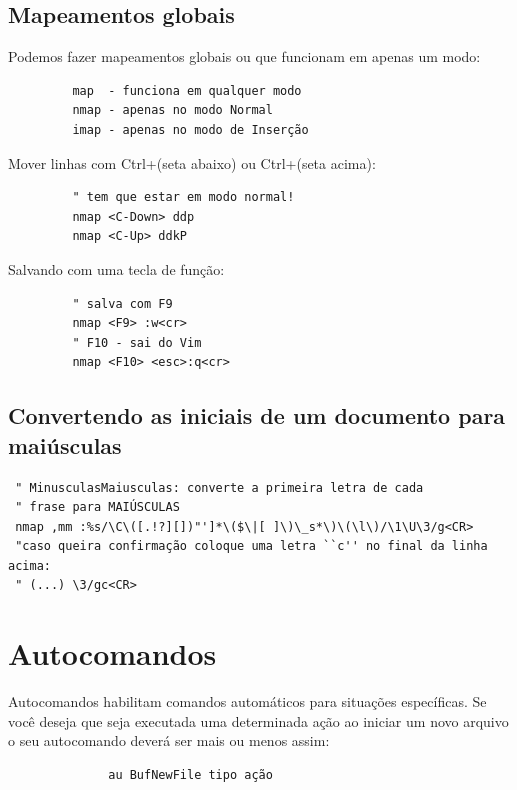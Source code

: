 \documentclass[10pt,a4paper,openany]{book}
\begin{document}
\subsection{Mapeamentos globais}


Podemos fazer mapeamentos globais ou que funcionam em apenas um modo:

\begin{verbatim}
		 map  - funciona em qualquer modo
		 nmap - apenas no modo Normal
		 imap - apenas no modo de Inserção
\end{verbatim}

Mover linhas com Ctrl+(seta abaixo) ou Ctrl+(seta acima):

\begin{verbatim}
		 " tem que estar em modo normal!
		 nmap <C-Down> ddp
		 nmap <C-Up> ddkP
\end{verbatim}

Salvando com uma tecla de função:

\begin{verbatim}
		 " salva com F9
		 nmap <F9> :w<cr>
		 " F10 - sai do Vim
		 nmap <F10> <esc>:q<cr>
\end{verbatim}

\subsection{Convertendo as iniciais de um documento para maiúsculas}
\label{Convertendo as iniciais de um documento para maiúsculas}

\begin{verbatim}
 " MinusculasMaiusculas: converte a primeira letra de cada
 " frase para MAIÚSCULAS
 nmap ,mm :%s/\C\([.!?][])"']*\($\|[ ]\)\_s*\)\(\l\)/\1\U\3/g<CR>
 "caso queira confirmação coloque uma letra ``c'' no final da linha acima:
 " (...) \3/gc<CR>
\end{verbatim}

\section{Autocomandos }\label{Autocomandos }

Autocomandos habilitam comandos automáticos para situações
específicas. Se você deseja que seja executada uma determinada ação ao
iniciar um novo arquivo o seu autocomando deverá ser mais ou menos
assim:

\begin{verbatim}
			  au BufNewFile tipo ação
\end{verbatim}
\end{document}
